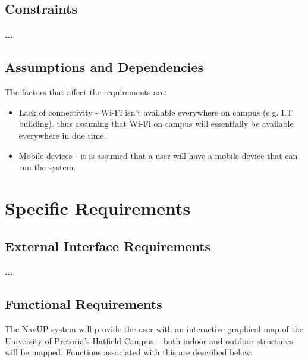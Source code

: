\documentclass[runningheads,a4paper]{llncs}
\begin{document}
\subsection{Constraints}
\paragraph{...}

\subsection{Assumptions and Dependencies}
\let\labelitemi\labelitemii
The factors that affect the requirements are:
\begin{itemize}
	 
		\item Lack of connectivity -  Wi-Fi isn't available everywhere on campus (e.g. I.T building). thus assuming that Wi-Fi on campus will essentially be available everywhere in due time. \\
		
		\item Mobile devices - it is assumed that a user will have a mobile device that can run the system.
	 
\end{itemize}


\section{Specific Requirements}

\subsection{External Interface Requirements}
\paragraph{...}
\subsection{Functional Requirements}

\let\labelitemi\labelitemii
The NavUP system will provide the user with an interactive graphical map of the University of Pretoria’s Hatfield Campus – both indoor and outdoor structures will be mapped. Functions associated with this are described below:
\end{document}
